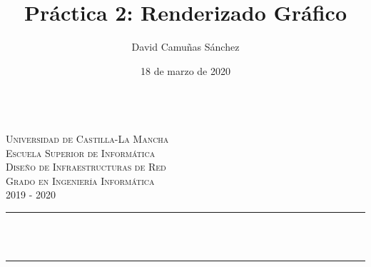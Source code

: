 \documentclass[11pt]{article}
\title{Práctica 2: Renderizado Gráfico}							%
\author{David Camuñas Sánchez}							%
\date{18 de marzo de 2020}											%
\makeatletter
\newcommand{\subject}{Diseño de Infraestructuras de Red}						%
\newcommand{\course}{Grado en Ingeniería Informática}	%
\newcommand{\courseyear}{2019 - 2020} 					%
\let\thetitle\@title
\makeatother
\begin{document}

\begin{titlepage}
	\centering
	\begin{minipage}[t]{\textwidth}
		\hspace{\fill}
	\end{minipage}
	\\[2.25 cm]
    \textsc{\LARGE Universidad de Castilla-La Mancha}\\[1 cm]	%
    \textsc{\LARGE Escuela Superior de Informática}\\[2.0 cm]
	\textsc{\Large \subject}\\[0.5 cm]				%
	\textsc{\large \course \\ \courseyear}\\[2 cm]				%
	\rule{\linewidth}{0.2 mm} \\[0.4 cm]
	{ \huge \bfseries \thetitle}\\
	\rule{\linewidth}{0.2 mm} \\[2.5 cm]


\end{titlepage}
\end{document}
